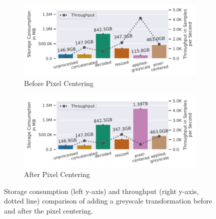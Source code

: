 \vspace{-0.2cm}
\begin{figure}[h]
    \begin{subfigure}[c]{0.23\textwidth}
        \includegraphics[width=\textwidth]{figures/imagenet-pipeline/storage-vs-throughput-gs-after-resize.pdf}
        \vspace{-18pt}
        \caption{{\color{diff}Before Pixel Centering}}
        \label{fig:ss-vs-thr-gs-before-pc}
    \end{subfigure}
    \begin{subfigure}[c]{0.23\textwidth}
        \includegraphics[width=\textwidth]{figures/imagenet-pipeline/storage-vs-throughput-gs-after-pc.pdf}
        \vspace{-18pt}
        \caption{{\color{diff}After Pixel Centering}}
        \label{fig:ss-vs-thr-gs-after-pc}
    \end{subfigure}
    \vspace{-10pt}
    \caption{{\color{diff}Storage consumption (left y-axis) and throughput (right y-axis, dotted line) comparison of adding a greyscale transformation before and after the pixel centering.}}
    \label{fig:imagenet-greyscale-comparison}
\end{figure}
\vspace{-0.2cm}

